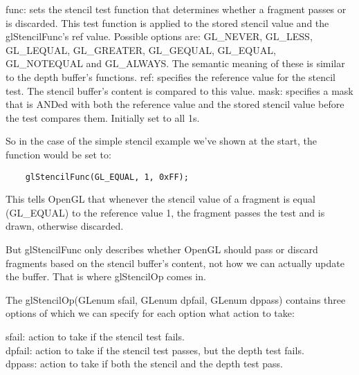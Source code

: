 \documentclass{article}
\begin{document}
    func: sets the stencil test function that determines whether a fragment passes or is discarded. This test function is applied to the stored stencil value and the glStencilFunc's ref value. Possible options are: GL\_NEVER, GL\_LESS, GL\_LEQUAL, GL\_GREATER, GL\_GEQUAL, GL\_EQUAL, GL\_NOTEQUAL and GL\_ALWAYS. The semantic meaning of these is similar to the depth buffer's functions.
    ref: specifies the reference value for the stencil test. The stencil buffer's content is compared to this value.
    mask: specifies a mask that is ANDed with both the reference value and the stored stencil value before the test compares them. Initially set to all 1s.

So in the case of the simple stencil example we've shown at the start, the function would be set to:

\begin{lstlisting}
    glStencilFunc(GL_EQUAL, 1, 0xFF);
\end{lstlisting}

This tells OpenGL that whenever the stencil value of a fragment is equal (GL\_EQUAL) to the reference value 1, the fragment passes the test and is drawn, otherwise discarded.

But glStencilFunc only describes whether OpenGL should pass or discard fragments based on the stencil buffer's content, not how we can actually update the buffer. That is where glStencilOp comes in.

The glStencilOp(GLenum sfail, GLenum dpfail, GLenum dppass) contains three options of which we can specify for each option what action to take:

    sfail: action to take if the stencil test fails.\\
    dpfail: action to take if the stencil test passes, but the depth test fails.\\
    dppass: action to take if both the stencil and the depth test pass.\\
\end{document}
